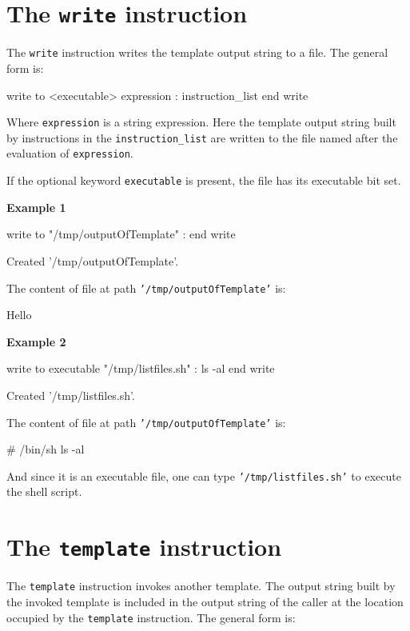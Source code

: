 \documentclass[10pt,openright,twosides,final]{memoir}
\newcommand{\gtltype}[1]{{\small\ttfamily #1}}
\newcommand{\gtlinline}[1]{\colorbox{light-blue}{\lstinline[language=gtl]{#1}}}
\newcommand{\examplen}[1]{\vspace{.75em}\noindent\textbf{Example #1}\vspace{0em}}
\begin{document}
\section{The \texttt{write} instruction}

The \gtlinline{write} instruction writes the template output string to a file. The general form is:

\begin{gtl}
write to <executable> expression :
  instruction_list
end write
\end{gtl}

Where \gtlinline{expression} is a \gtltype{string} expression. Here the template output string built by instructions in the \gtlinline{instruction_list} are written to the file named after the evaluation of \gtlinline{expression}. 

If the optional keyword \gtlinline{executable} is present, the file has its executable bit set.

\examplen{1}
\begin{gtl}
write to "/tmp/outputOfTemplate" :
%
end write
\end{gtl}
\begin{console}
Created '/tmp/outputOfTemplate'.
\end{console}

\noindent The content of file at path \texttt{\small '/tmp/outputOfTemplate'} is:
\begin{templateoutput}
Hello
\end{templateoutput}

\examplen{2}
\begin{gtl}
write to executable "/tmp/listfiles.sh" :
ls -al
%
end write
\end{gtl}
\begin{console}
Created '/tmp/listfiles.sh'.
\end{console}

\noindent The content of file at path \texttt{\small '/tmp/outputOfTemplate'} is:
\begin{templateoutput}
# /bin/sh
ls -al
\end{templateoutput}
And since it is an executable file, one can type \texttt{\small '/tmp/listfiles.sh'} to execute the shell script.

\section{The \texttt{template} instruction}

The \gtlinline{template} instruction invokes another template. The output string built by the invoked template is included in the output string of the caller at the location occupied by the \gtlinline{template} instruction. The general form is:
\end{document}
